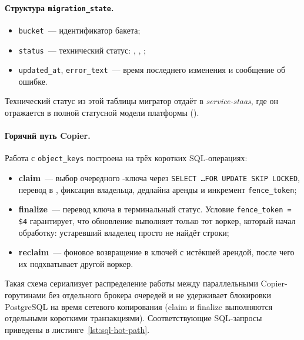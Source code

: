 \paragraph{Структура \texttt{migration\_state}.}
\begin{itemize}
    \item \texttt{bucket}~--- идентификатор бакета;
    \item \texttt{status}~--- технический статус: , , ;
    \item \texttt{updated\_at}, \texttt{error\_text}~--- время последнего изменения и сообщение об ошибке.
\end{itemize}
Технический статус из этой таблицы мигратор отдаёт в \textit{service-staas}, где он отражается в полной статусной модели платформы ().

\paragraph{Горячий путь Copier.}
Работа с \texttt{object\_keys} построена на трёх коротких SQL-операциях:

\begin{itemize}
    \item \textbf{claim}~--- выбор очередного -ключа через \texttt{SELECT \ldots FOR UPDATE SKIP LOCKED}, перевод в , фиксация владельца, дедлайна аренды и инкремент \texttt{fence\_token};
    \item \textbf{finalize}~--- перевод ключа в терминальный статус. Условие \texttt{fence\_token = \$4} гарантирует, что обновление выполняет только тот воркер, который начал обработку: устаревший владелец просто не найдёт строки;
    \item \textbf{reclaim}~--- фоновое возвращение в  ключей с истёкшей арендой, после чего их подхватывает другой воркер.
\end{itemize}

Такая схема сериализует распределение работы между параллельными Copier-горутинами без отдельного брокера очередей и не удерживает блокировки PostgreSQL на время сетевого копирования (claim и finalize выполняются отдельными короткими транзакциями).
Соответствующие SQL-запросы приведены в листинге~\ref{lst:sql-hot-path}.

